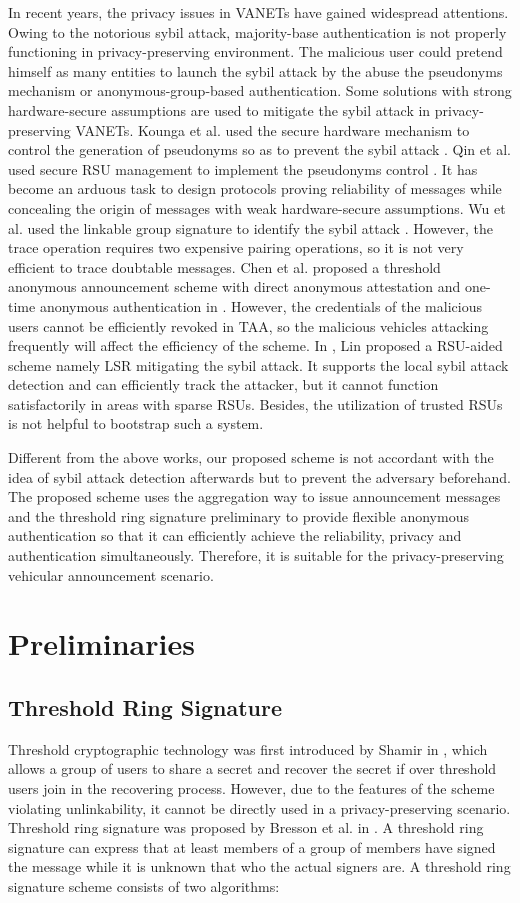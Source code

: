 \documentclass[a4paper]{article}
\begin{document}
In recent years, the privacy issues in VANETs have gained widespread attentions. Owing to the notorious sybil attack, majority-base authentication is not properly functioning in privacy-preserving environment. The malicious user could pretend himself as many entities to launch the sybil attack by the abuse the pseudonyms mechanism or anonymous-group-based authentication. Some solutions with strong hardware-secure assumptions are used to mitigate the sybil attack in privacy-preserving VANETs. Kounga et al. used the secure hardware mechanism to control the generation of pseudonyms so as to prevent the sybil attack \cite{KWL09}. Qin et al. used secure RSU management to implement the pseudonyms control \cite{QWD12}. It has become an arduous task to design protocols proving reliability of messages while concealing the origin of messages with weak hardware-secure assumptions. Wu et al. used the linkable group signature to identify the sybil attack \cite{WDG10}. However, the trace operation requires two expensive pairing operations, so it is not very efficient to trace doubtable messages. Chen et al. proposed a threshold anonymous announcement scheme with direct anonymous attestation and one-time anonymous authentication in \cite{CNW11}. However, the credentials of the malicious users cannot be efficiently revoked in TAA, so the malicious vehicles attacking frequently will affect the efficiency of the scheme. In \cite{Lin13}, Lin proposed a RSU-aided scheme namely LSR mitigating the sybil attack. It supports the local sybil attack detection and can efficiently track the attacker, but it cannot function satisfactorily in areas with sparse RSUs. Besides, the utilization of trusted RSUs is not helpful to bootstrap such a system.

Different from the above works, our proposed scheme is not accordant with the idea of sybil attack detection afterwards but to prevent the adversary beforehand. The proposed scheme uses the aggregation way to issue announcement messages and the threshold ring signature preliminary to provide flexible anonymous authentication so that it can efficiently achieve the reliability, privacy and authentication simultaneously. Therefore, it is suitable for the privacy-preserving vehicular announcement scenario.

\section{Preliminaries}
\subsection{Threshold Ring Signature}
Threshold cryptographic technology was first introduced by Shamir in \cite{Sha79}, which allows a group of users to share a secret and recover the secret if over threshold users join in the recovering process. However, due to the features of the scheme violating unlinkability, it cannot be directly used in a privacy-preserving scenario. Threshold ring signature was proposed by Bresson et al. in \cite{BSS02}. A threshold ring signature can express that at least  members of a group of  members have signed the message while it is unknown that who the actual signers are. A threshold ring signature scheme consists of two algorithms:
\end{document}
